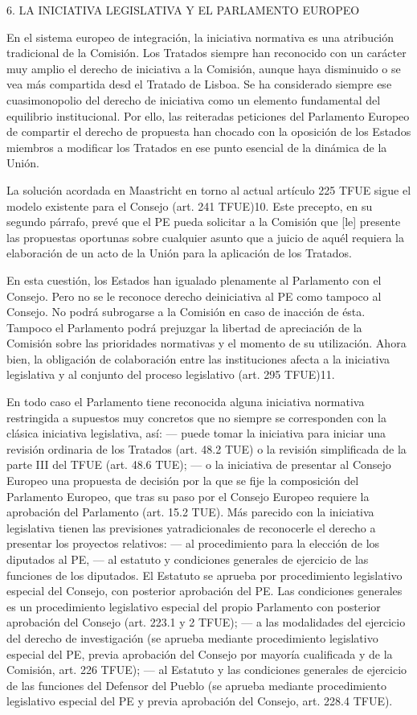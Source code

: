 \documentclass[10pt,a4paper]{article}
\begin{document}
6. LA INICIATIVA LEGISLATIVA Y EL PARLAMENTO EUROPEO

En el sistema europeo de integración, la iniciativa normativa es una atribución tradicional de la Comisión. Los Tratados siempre han reconocido con un carácter muy amplio el derecho de iniciativa a la Comisión, aunque haya disminuido o se vea más compartida desd el Tratado de Lisboa. Se ha considerado siempre ese cuasimonopolio del derecho de iniciativa como un elemento fundamental del equilibrio institucional. Por ello, las reiteradas peticiones del Parlamento Europeo de compartir el derecho de propuesta han chocado con la oposición de los Estados miembros a modificar los Tratados en ese punto esencial de la dinámica de la Unión. 

La solución acordada en Maastricht en torno al actual artículo 225 TFUE sigue el modelo existente para el Consejo (art. 241 TFUE)10. Este precepto, en su segundo párrafo, prevé que el PE pueda solicitar a la Comisión que [le] presente las propuestas oportunas sobre cualquier asunto que a juicio de aquél requiera la elaboración de un acto de la Unión para la aplicación de los Tratados.

En esta cuestión, los Estados han igualado plenamente al Parlamento con el Consejo. Pero no se le reconoce derecho deiniciativa al PE como tampoco al Consejo. No podrá subrogarse a la Comisión en caso de inacción de ésta. Tampoco el Parlamento podrá prejuzgar la libertad de apreciación de la Comisión sobre las prioridades normativas y el momento de su utilización. Ahora bien, la obligación de colaboración entre las instituciones afecta a la iniciativa legislativa y al conjunto del proceso legislativo (art. 295 TFUE)11.

En todo caso el Parlamento tiene reconocida alguna iniciativa normativa restringida a supuestos muy concretos que no siempre se corresponden con la clásica iniciativa legislativa, así: — puede tomar la iniciativa para iniciar una revisión ordinaria de los Tratados (art. 48.2 TUE) o la revisión simplificada de la parte III del TFUE (art. 48.6 TUE); — o la iniciativa de presentar al Consejo Europeo una propuesta de decisión por la que se fije la composición del Parlamento Europeo, que tras su paso por el Consejo Europeo requiere la aprobación del Parlamento (art. 15.2 TUE). Más parecido con la iniciativa legislativa tienen las previsiones yatradicionales de reconocerle el derecho a presentar los proyectos relativos:
— al procedimiento para la elección de los diputados al PE,
— al estatuto y condiciones generales de ejercicio de las funciones de los diputados. El Estatuto se aprueba por procedimiento legislativo especial del Consejo, con posterior aprobación del PE. Las condiciones generales es un procedimiento legislativo especial del propio Parlamento con posterior aprobación del Consejo (art. 223.1 y 2 TFUE);
— a las modalidades del ejercicio del derecho de investigación (se aprueba mediante procedimiento legislativo especial del PE, previa aprobación del Consejo por mayoría cualificada y de la Comisión, art. 226 TFUE);
— al Estatuto y las condiciones generales de ejercicio de las funciones del Defensor del Pueblo (se aprueba mediante procedimiento legislativo especial del PE y previa aprobación del Consejo, art. 228.4 TFUE).
\end{document}

